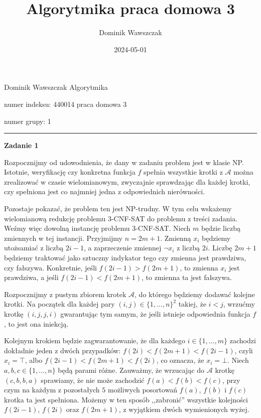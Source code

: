 \documentclass[12pt]{article}
\title{Algorytmika praca domowa 3}
\author{Dominik Wawszczak}
\date{2024-05-01}
\begin{document}
	\setlength{\parindent}{0 cm}
	
	Dominik Wawszczak \hfill Algorytmika
	
	numer indeksu: 440014 \hfill praca domowa 3
	
	numer grupy: 1
	
	\bigskip
	\hrule
	\bigskip
	
	\textbf{Zadanie 1}
	
	\medskip
	
	Rozpocznijmy od udowodnienia, że dany w zadaniu problem jest w klasie NP.
	Istotnie, weryfikację czy konkretna funkcja \(f\) spełnia wszystkie krotki
	z \(\mathcal{A}\) można zrealizować w czasie wielomianowym, zwyczajnie
	sprawdzając dla każdej krotki, czy spełniona jest co najmniej jedna z
	odpowiednich nierówności.
	
	\medskip
	
	Pozostaje pokazać, że problem ten jest NP-trudny. W tym celu wskażemy
	wielomianową redukcję problemu 3-CNF-SAT do problemu z treści zadania.
	Weźmy więc dowolną instancję problemu 3-CNF-SAT. Niech \(m\) będzie liczbą
	zmiennych w tej instancji. Przyjmijmy \(n = 2m + 1\). Zmienną \(x_{i}\)
	będziemy utożsamiać z liczbą \(2i - 1\), a zaprzeczenie zmiennej \(\neg
	x_{i}\) z liczbą \(2i\). Liczbę \(2m + 1\) będziemy traktować jako sztuczny
	indykator tego czy zmienna jest prawdziwa, czy fałszywa. Konkretnie, jeśli
	\(f(2i - 1) > f(2m + 1)\), to zmienna \(x_{i}\) jest prawdziwa, a jeśli
	\(f(2i - 1) < f(2m + 1)\), to zmienna ta jest fałszywa.
	
	\medskip
	
	Rozpocznijmy z pustym zbiorem krotek \(\mathcal{A}\), do którego będziemy
	dodawać kolejne krotki. Na początek dla każdej pary \((i, j) \in \{1,
	\ldots, n\}^{2}\) takiej, że \(i < j\), wrzućmy krotkę \((i, j, j, i)\)
	gwarantując tym samym, że jeśli istnieje odpowiednia funkcja \(f\), to jest
	ona iniekcją.
	
	\medskip
	
	Kolejnym krokiem będzie zagwarantowanie, że dla każdego \(i \in \{1, \ldots,
	m\}\) zachodzi dokładnie jeden z dwóch przypadków: \(f(2i) < f(2m + 1) <
	f(2i - 1)\), czyli \(x_{i} = \top\), albo \(f(2i - 1) < f(2m + 1) < f(2i)\),
	co oznacza, że \(x_{i} = \bot\). Niech \(a, b, c \in \{1, \ldots, n\}\) będą
	parami różne. Zauważmy, że wrzucając do \(\mathcal{A}\) krotkę \((c, b, b,
	a)\) sprawiamy, że nie może zachodzić \(f(a) < f(b) < f(c)\), przy czym na
	każdym z pozostałych \(5\) możliwych posortowań \(f(a)\), \(f(b)\) i
	\(f(c)\) krotka ta jest spełniona. Możemy w ten sposób ,,zabronić''
	wszystkie kolejności  \(f(2i - 1)\), \(f(2i)\) oraz \(f(2m + 1)\), z
	wyjątkiem dwóch wymienionych wyżej.
	
\end{document}
